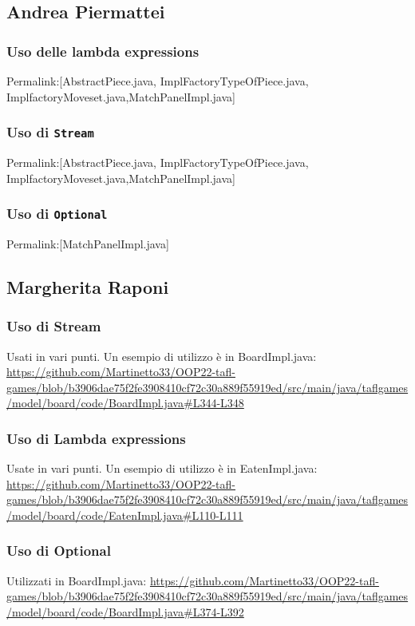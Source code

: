 \documentclass[a4paper,12pt]{report}
\begin{document}
\subsection{Andrea Piermattei}
\subsubsection{Uso delle lambda expressions}
Permalink:[AbstractPiece.java, ImplFactoryTypeOfPiece.java, ImplfactoryMoveset.java,MatchPanelImpl.java]

\subsubsection{Uso di \texttt{Stream}}
Permalink:[AbstractPiece.java, ImplFactoryTypeOfPiece.java, ImplfactoryMoveset.java,MatchPanelImpl.java]

\subsubsection{Uso di \texttt{Optional}}
Permalink:[MatchPanelImpl.java]

\subsection{Margherita Raponi}

\subsubsection{Uso di Stream}
Usati in vari punti. Un esempio di utilizzo è in BoardImpl.java: \url{https://github.com/Martinetto33/OOP22-tafl-games/blob/b3906dae75f2fe3908410cf72c30a889f55919ed/src/main/java/taflgames/model/board/code/BoardImpl.java#L344-L348}

\subsubsection{Uso di Lambda expressions}
Usate in vari punti. Un esempio di utilizzo è in EatenImpl.java: \url{https://github.com/Martinetto33/OOP22-tafl-games/blob/b3906dae75f2fe3908410cf72c30a889f55919ed/src/main/java/taflgames/model/board/code/EatenImpl.java#L110-L111}

\subsubsection{Uso di Optional}
Utilizzati in BoardImpl.java: \url{https://github.com/Martinetto33/OOP22-tafl-games/blob/b3906dae75f2fe3908410cf72c30a889f55919ed/src/main/java/taflgames/model/board/code/BoardImpl.java#L374-L392}
\end{document}
